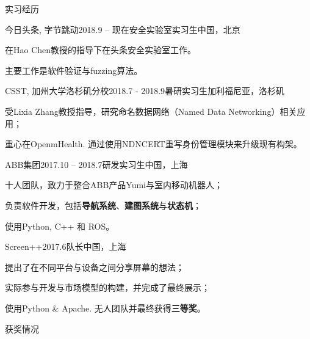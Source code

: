 \documentclass{resume} %
\begin{document}
\begin{rSection}{实习经历}

\begin{rSubsection}
  {今日头条, 字节跳动}{2018.9 – 现在}{安全实验室实习生}{中国，北京}
    \item 在Hao Chen教授的指导下在头条安全实验室工作。
    \item 主要工作是软件验证与fuzzing算法。
\end{rSubsection}


\begin{rSubsection}
  {CSST, 加州大学洛杉矶分校}{2018.7 - 2018.9}{暑研实习生}{加利福尼亚，洛杉矶}
    \item 受Lixia Zhang教授指导，研究命名数据网络（Named Data Networking）相关应用；
    \item 重心在OpenmHealth. 通过使用NDNCERT重写身份管理模块来升级现有构架。
\end{rSubsection}


\begin{rSubsection}
  {ABB集团}{2017.10 – 2018.7}{研发实习生}{中国，上海}
    \item 十人团队，致力于整合ABB产品Yumi与室内移动机器人；
    \item 负责软件开发，包括\textbf{导航系统}、\textbf{建图系统}与\textbf{状态机}；
    \item 使用Python, C++ 和 ROS。
\end{rSubsection}


\begin{rSubsection}
  {Screen++}{2017.6}{队长}{中国，上海}
    \item 提出了在不同平台与设备之间分享屏幕的想法；
    \item 实际参与开发与市场模型的构建，并完成了最终展示；
    \item 使用Python \& Apache. 无人团队并最终获得\textbf{三等奖}。
\end{rSubsection}

\end{rSection}

\begin{rSection}{获奖情况}
\end{rSection}
\end{document}
